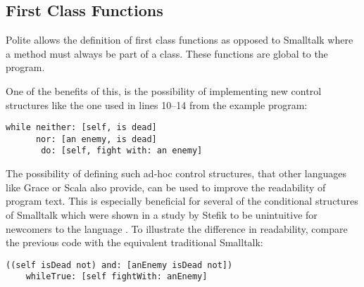 \subsection {First Class Functions}
Polite allows the definition of first class functions as opposed to Smalltalk where a method must always be part of a class. These functions are global to the program. 

One of the benefits of this, is the possibility of implementing new control structures like the one used in lines 10--14 from the example program: 

\begin{verbatim}
while neither: [self, is dead] 
	  nor: [an enemy, is dead] 
	   do: [self, fight with: an enemy] 
\end{verbatim}

The possibility of defining such ad-hoc control structures, that other languages like Grace or Scala also provide, can be used to improve the readability of program text. This is especially beneficial for several of the conditional structures of Smalltalk which were shown in a study by Stefik to be unintuitive for newcomers to the language \cite{Stef13}. To illustrate the difference in readability, compare the previous code with the equivalent traditional Smalltalk: 

\begin{verbatim}
((self isDead not) and: [anEnemy isDead not]) 
	whileTrue: [self fightWith: anEnemy]
\end{verbatim}




